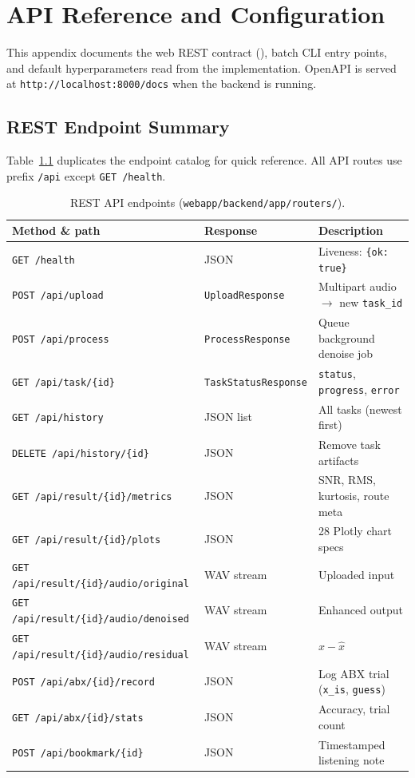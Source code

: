 \chapter{API Reference and Configuration}
\label{app:api}

This appendix documents the web REST contract (), batch CLI entry points, and default hyperparameters read from the implementation. OpenAPI is served at \texttt{http://localhost:8000/docs} when the backend is running.

\section{REST Endpoint Summary}
\label{app:api_endpoints}

Table~\ref{tab:api_appendix} duplicates the endpoint catalog for quick reference. All API routes use prefix \texttt{/api} except \texttt{GET /health}.

\begin{table}[H]
  \centering
  \caption{REST API endpoints (\texttt{webapp/backend/app/routers/}).}
  \label{tab:api_appendix}
  \footnotesize
  \begin{tabularx}{\textwidth}{l l X}
    \toprule
    \textbf{Method \& path} & \textbf{Response} & \textbf{Description} \\
    \midrule
    \texttt{GET /health} & JSON & Liveness: \texttt{\{ok: true\}} \\
    \texttt{POST /api/upload} & \texttt{UploadResponse} & Multipart audio $\to$ new \texttt{task\_id} \\
    \texttt{POST /api/process} & \texttt{ProcessResponse} & Queue background denoise job \\
    \texttt{GET /api/task/\{id\}} & \texttt{TaskStatusResponse} & \texttt{status}, \texttt{progress}, \texttt{error} \\
    \texttt{GET /api/history} & JSON list & All tasks (newest first) \\
    \texttt{DELETE /api/history/\{id\}} & JSON & Remove task artifacts \\
    \texttt{GET /api/result/\{id\}/metrics} & JSON & SNR, RMS, kurtosis, route meta \\
    \texttt{GET /api/result/\{id\}/plots} & JSON & 28 Plotly chart specs \\
    \texttt{GET /api/result/\{id\}/audio/original} & WAV stream & Uploaded input \\
    \texttt{GET /api/result/\{id\}/audio/denoised} & WAV stream & Enhanced output \\
    \texttt{GET /api/result/\{id\}/audio/residual} & WAV stream & $x-\hat{x}$ \\
    \texttt{POST /api/abx/\{id\}/record} & JSON & Log ABX trial (\texttt{x\_is}, \texttt{guess}) \\
    \texttt{GET /api/abx/\{id\}/stats} & JSON & Accuracy, trial count \\
    \texttt{POST /api/bookmark/\{id\}} & JSON & Timestamped listening note \\
    \bottomrule
  \end{tabularx}
\end{table}

